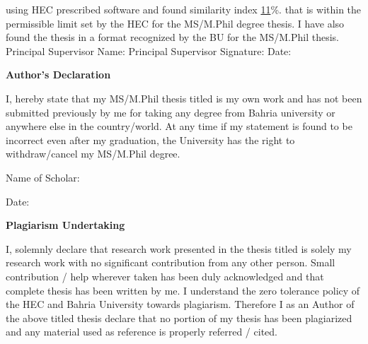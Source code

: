 using HEC prescribed software and found similarity index \underline{11}\%.
that is within the permissible limit set by the HEC for the MS/M.Phil degree thesis. I have also found the thesis in a format recognized by the BU for the MS/M.Phil thesis. 
\newline \newline
Principal Supervisor Name:  \SupervisorName
\newline
Principal Supervisor Signature: 
\newline 
Date: 

\newpage
{}
\begin{center}
	\large \textbf{Author's Declaration}
\end{center}
\vskip 0.45in
I, \underline{\AuthorName} hereby state that my MS/M.Phil thesis titled is my own work and has not been submitted previously by me for taking any degree from Bahria university or anywhere else in the country/world. At any time if my statement is found to be incorrect even after my graduation, the University has the right to
withdraw/cancel my MS/M.Phil degree.


\vskip 0.2in

\hspace{50mm}Name of Scholar: \AuthorName

\vskip 0.1in

\hspace{50mm}Date:

\newpage
{}
\begin{center}
	\large \textbf{Plagiarism Undertaking}
\end{center}
\vskip 0.45in
I, solemnly declare that research work presented in the thesis titled \underline{\ThesisTitle}
is solely my research work with no significant contribution from any other person. Small contribution / help wherever taken has been duly acknowledged and that complete thesis has been written by me. I understand the zero tolerance policy of the HEC and Bahria University towards plagiarism. Therefore I as an Author of the above titled thesis declare that no portion of my thesis has been plagiarized and any material used as reference is properly referred / cited.

